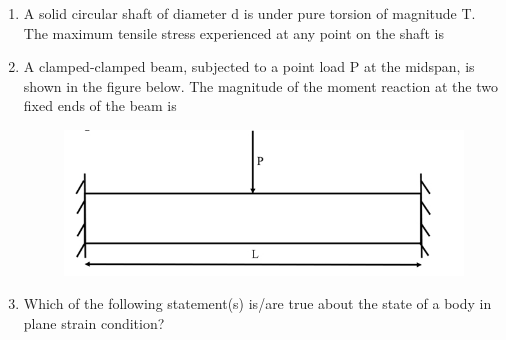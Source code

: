 \documentclass[journal,12pt,onecolumn]{IEEEtran}
\theoremstyle{remark}
\begin{document}
\begin{enumerate}
    \item A solid circular shaft of diameter d is under pure torsion of magnitude T. The maximum tensile stress experienced at any point on the shaft is
    \hfill{}

    \begin{enumerate}
    \end{enumerate}

    \item A clamped-clamped beam, subjected to a point load P at the midspan, is shown in the figure below. The magnitude of the moment reaction at the two fixed ends of the beam is
    \hfill{}
    
    \begin{figure}[H]
        \centering
        \includegraphics[width=0.8\columnwidth]{q30}
        \caption*{}
        \label{fig:q30}
    \end{figure}

    \begin{enumerate}
    \end{enumerate}

    \item Which of the following statement(s) is/are true about the state of a body in plane strain condition?
    

\end{enumerate}
\end{document}
